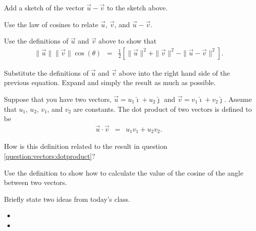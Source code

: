 \begin{problem}
  \begin{subproblem}
    \item Add a sketch of the vector $\vec{u}-\vec{v}$ to the sketch above.
    \item Use the law of cosines to relate $\vec{u}$, $\vec{v}$, and $\vec{u}-\vec{v}$.
      \vspace{4em}
    \item Use the definitions of $\vec{u}$ and $\vec{v}$ above to show that
    \begin{eqnarray*}
      \|\vec{u}\| \|\vec{v}\| \cos(\theta) & = & \frac{1}{2} \left[ \|\vec{u}\|^2 +  \|\vec{v}\|^2 -  \|\vec{u}-\vec{v}\|^2\right].
    \end{eqnarray*}
    \vfill
    \item Substitute the definitions of $\vec{u}$ and $\vec{v}$ above into the right hand side of the previous equation. Expand and simply the result as much as possible.
    \label{question:vectors:dotproduct}
    \vfill
  \end{subproblem}

  \clearpage

  \item Suppose that you have two vectors, $\vec{u}=u_1 \hat{\imath}+u_2\hat{\jmath}$ and $\vec{v}=v_1 \hat{\imath}+v_2\hat{\jmath}$.
      Assume that $u_1$, $u_2$, $v_1$, and $v_2$ are constants. The dot product of two vectors is defined to be
      \begin{eqnarray*}
        \vec{u} \cdot \vec{v} & = & u_1 v_1 + u_2 v_2.
      \end{eqnarray*}

    \begin{subproblem}
        \item How is this definition related to the result in question \ref{question:vectors:dotproduct}?
        \vfill
        \item Use the definition to show how to calculate the value of the cosine of the angle between two vectors.
        \vfill
    \end{subproblem}

\end{problem}


\postClass

\begin{problem}
\item Briefly state two ideas from today's class.
  \begin{itemize}
  \item
  \item
  \end{itemize}
\item
  \begin{subproblem}
    \item
  \end{subproblem}
\end{problem}

